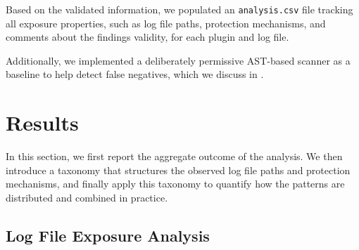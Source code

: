\documentclass[sigconf]{acmart}
\begin{document}
Based on the validated information, we populated an \texttt{analysis.csv} file tracking all exposure properties, such as log file paths, protection mechanisms, and comments about the findings validity, for each plugin and log file.

Additionally, we implemented a deliberately permissive AST-based scanner as a baseline to help detect false negatives, which we discuss in .  

\section{Results}\label{sec:results}

In this section, we first report the aggregate outcome of the analysis. 
We then introduce a taxonomy that structures the observed log file paths and protection mechanisms, and finally apply this taxonomy to quantify how the patterns are distributed and combined in practice.

\subsection{Log File Exposure Analysis}\label{sec:results:logfiles}
\end{document}
